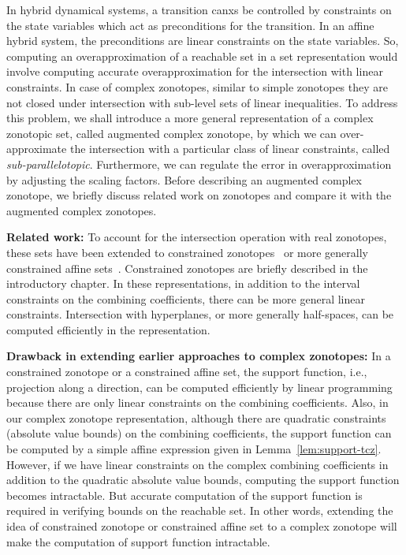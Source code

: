 In hybrid dynamical systems, a transition canxs be controlled by
constraints on the state variables which act as preconditions for the
transition.  In an affine hybrid system, the preconditions are linear
constraints on the state variables.  So, computing an
overapproximation of a reachable set in a set representation would
involve computing accurate overapproximation for the intersection with
linear constraints.  In case of complex zonotopes, similar to simple
zonotopes they are not closed under intersection with sub-level sets
of linear inequalities.  To address this problem, we shall introduce a
more general representation of a complex zonotopic set, called
augmented complex zonotope, by which we can over-approximate the
intersection with a particular class of linear constraints, called
\emph{sub-parallelotopic}.  Furthermore, we can regulate the error in
overapproximation by adjusting the scaling factors.  Before describing
an augmented complex zonotope, we briefly discuss related work on
zonotopes and compare it with the augmented complex zonotopes.  

{\bf Related work: } To account for the intersection operation with
real zonotopes, these sets have been extended to constrained
zonotopes~\cite{scott2016constrained} or more generally constrained
affine sets~\cite{Ghorbal2010}.  Constrained zonotopes are briefly described
in the introductory chapter.  In these representations, in addition to
the interval constraints on the combining coefficients, there can be
more general linear constraints.  Intersection with hyperplanes, or
more generally half-spaces, can be computed efficiently in the
representation.

{\bf Drawback in extending earlier approaches to complex zonotopes: }
In a constrained zonotope or a constrained affine set, the support
function, i.e., projection along a direction, can be computed
efficiently by linear programming because there are only linear
constraints on the combining coefficients.  Also, in our complex
zonotope representation, although there are quadratic constraints
(absolute value bounds) on the combining coefficients, the support
function can be computed by a simple affine expression given in
Lemma~\ref{lem:support-tcz}.  However, if we have linear constraints on the
complex combining coefficients in addition to the quadratic absolute
value bounds, computing the support function becomes intractable.  But
accurate computation of the support function is required in verifying
bounds on the reachable set.  In other words, extending the idea of
constrained zonotope or constrained affine set to a complex zonotope
will make the computation of support function intractable.

